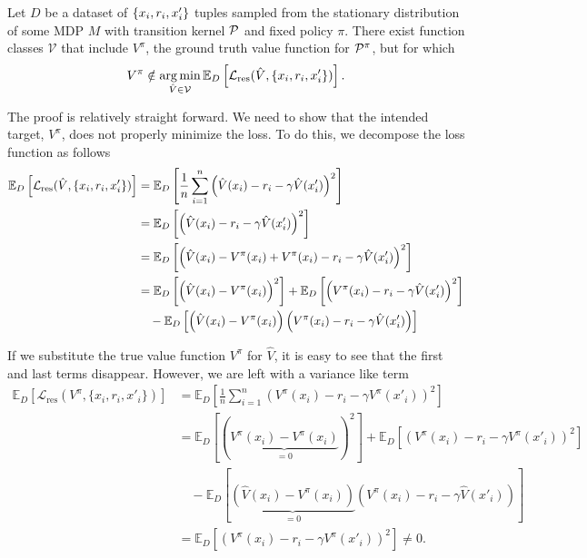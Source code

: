 \begin{proposition}
    Let $D$ be a dataset of $\{\state_i,r_i,\state'_i\}$ tuples sampled from the stationary distribution of some MDP $M$ with transition kernel $\P$ and fixed policy $\pi$.
    There exist function classes $\mathcal{V}$ that include $V^\pi$, the ground truth value function for $\P^\pi$, but for which 
    \[V^\pi \notin \argmin_{\hat{V} \in \mathcal{V}} \mathbb{E}_{D} \left[\mathcal{L}_\mathrm{res}(\hat{V}, \{\state_i, r_i, \state'_i\})\right].\]
\end{proposition}

The proof is relatively straight forward.
We need to show that the intended target, $V^\pi$, does not properly minimize the loss.
To do this, we decompose the loss function as follows
\begin{align}
    \mathbb{E}_{D} \left[\mathcal{L}_\mathrm{res}(\hat{V}, \{\state_i, r_i, \state'_i\})\right] &= \mathbb{E}_{D} \left[\frac{1}{n} \sum_{i=1}^n \left(\hat{V}(\state_i) - r_i - \gamma \hat{V}(\state'_i)\right)^2\right] \\
    &=\mathbb{E}_{D} \left[\left(\hat{V}(x_i) - r_i - \gamma \hat{V}(x'_i)\right)^2\right] \\
    &=\mathbb{E}_{D} \left[\left(\hat{V}(x_i) - V^\pi(x_i) + V^\pi(x_i) - r_i - \gamma \hat{V}(x'_i)\right)^2\right] \\
    &=\mathbb{E}_{D} \left[\left(\hat{V}(x_i) - V^\pi(x_i)\right)^2\right] + \mathbb{E}_{D}\left[\left( V^\pi(x_i) - r_i - \gamma \hat{V}(x'_i)\right)^2\right] \\
    &\quad - \mathbb{E}_{D}\left[\left(\hat{V}(x_i) - V^\pi(x_i)\right)\left( V^\pi(x_i) - r_i - \gamma \hat{V}(x'_i)\right)\right]\\
\end{align}

If we substitute the true value function $V^\pi$ for $\hat{V}$, it is easy to see that the first and last terms disappear.
However, we are left with a variance like term
\begin{align}
    \mathbb{E}_{D} \left[\mathcal{L}_\mathrm{res}(V^\pi, \{x_i, r_i, x'_i\})\right] &= \mathbb{E}_{D} \left[\frac{1}{n} \sum_{i=1}^n \left(V^\pi(x_i) - r_i - \gamma V^\pi(x'_i)\right)^2\right] \\
    &=\mathbb{E}_{D} \left[\left(\underbrace{V^\pi(x_i) - V^\pi(x_i)}_{=0}\right)^2\right] + \mathbb{E}_{D}\left[\left( V^\pi(x_i) - r_i - \gamma V^\pi(x'_i)\right)^2\right] \\
    &\quad - \mathbb{E}_{D}\left[\underbrace{\left(\hat{V}(x_i) - V^\pi(x_i)\right)}_{=0}\left( V^\pi(x_i) - r_i - \gamma \hat{V}(x'_i)\right)\right]\\
    &=\mathbb{E}_{D}\left[\left( V^\pi(x_i) - r_i - \gamma V^\pi(x'_i)\right)^2\right] \neq 0.
\end{align}

